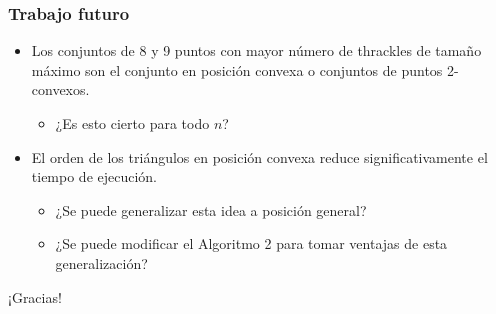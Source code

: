 \documentclass{beamer}
\begin{document}
\begin{frame}
  \frametitle{Trabajo futuro}
  \begin{itemize}
    \item Los conjuntos de 8 y 9 puntos con mayor número de thrackles de tamaño
      máximo son el conjunto en posición convexa o conjuntos de puntos
      2-convexos.
      \begin{itemize}
        \item ¿Es esto cierto para todo $n$?
      \end{itemize}
    \item El orden de los triángulos en posición convexa reduce
      significativamente el tiempo de ejecución.
      \begin{itemize}
        \item ¿Se puede generalizar esta idea a posición general?
        \item ¿Se puede modificar el Algoritmo 2 para tomar ventajas de esta generalización?
      \end{itemize}
  \end{itemize}
\end{frame}

\begin{frame}[c]
  \begin{center}
    \Huge ¡Gracias!
  \end{center}
\end{frame}
\end{document}
